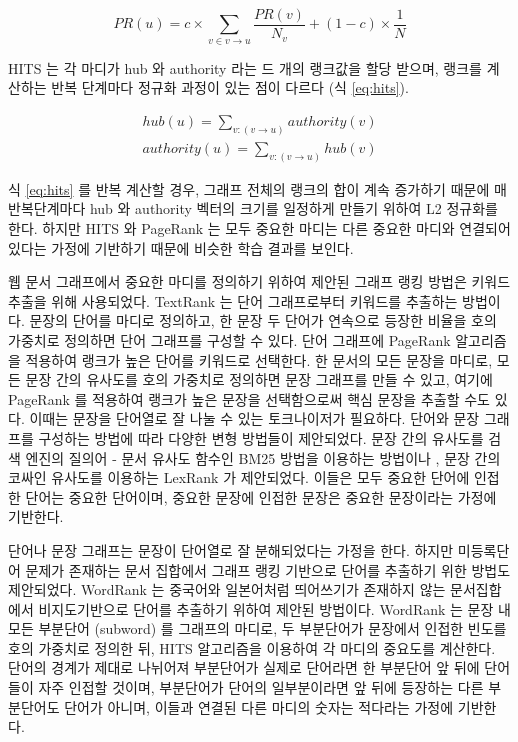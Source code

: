 \documentclass[11pt]{article}
\begin{document}
\begin{equation}
  \label{eq:pagerank2}
  PR(u) = c \times \sum_{v \in v \rightarrow u} \frac{PR(v)}{N_v} + (1-c) \times \frac{1}{N}
\end{equation}

HITS 는 각 마디가 hub 와 authority 라는 드 개의 랭크값을 할당 받으며, 랭크를 계산하는 반복 단계마다 정규화 과정이 있는 점이 다르다 (식 \ref{eq:hits}).

\begin{equation}
  \label{eq:hits}
  \begin{aligned}
  hub(u) = \sum_{v:(v \rightarrow u)} authority(v) \\
  authority(u) = \sum_{v:(v \rightarrow u)} hub(v)
  \end{aligned}
\end{equation}

식 \ref{eq:hits} 를 반복 계산할 경우, 그래프 전체의 랭크의 합이 계속 증가하기 때문에 매 반복단계마다 hub 와 authority 벡터의 크기를 일정하게 만들기 위하여 L2 정규화를 한다.
하지만 HITS 와 PageRank 는 모두 중요한 마디는 다른 중요한 마디와 연결되어 있다는 가정에 기반하기 때문에 비슷한 학습 결과를 보인다.

웹 문서 그래프에서 중요한 마디를 정의하기 위하여 제안된 그래프 랭킹 방법은 키워드 추출을 위해 사용되었다.
TextRank \citep{mihalcea2004textrank} 는 단어 그래프로부터 키워드를 추출하는 방법이다.
문장의 단어를 마디로 정의하고, 한 문장 두 단어가 연속으로 등장한 비율을 호의 가중치로 정의하면 단어 그래프를 구성할 수 있다.
단어 그래프에 PageRank 알고리즘을 적용하여 랭크가 높은 단어를 키워드로 선택한다.
한 문서의 모든 문장을 마디로, 모든 문장 간의 유사도를 호의 가중치로 정의하면 문장 그래프를 만들 수 있고, 여기에 PageRank 를 적용하여 랭크가 높은 문장을 선택함으로써 핵심 문장을 추출할 수도 있다.
이때는 문장을 단어열로 잘 나눌 수 있는 토크나이저가 필요하다.
단어와 문장 그래프를 구성하는 방법에 따라 다양한 변형 방법들이 제안되었다.
문장 간의 유사도를 검색 엔진의 질의어 - 문서 유사도 함수인 BM25 \citep{robertson2009probabilistic} 방법을 이용하는 방법이나 \citep{barrios2016variations}, 문장 간의 코싸인 유사도를 이용하는 LexRank \citep{erkan2004lexrank} 가 제안되었다.
이들은 모두 중요한 단어에 인접한 단어는 중요한 단어이며, 중요한 문장에 인접한 문장은 중요한 문장이라는 가정에 기반한다.

단어나 문장 그래프는 문장이 단어열로 잘 분해되었다는 가정을 한다.
하지만 미등록단어 문제가 존재하는 문서 집합에서 그래프 랭킹 기반으로 단어를 추출하기 위한 방법도 제안되었다.
WordRank \citep{chen2011simple} 는 중국어와 일본어처럼 띄어쓰기가 존재하지 않는 문서집합에서 비지도기반으로 단어를 추출하기 위하여 제안된 방법이다.
WordRank 는 문장 내 모든 부분단어 (subword) 를 그래프의 마디로, 두 부분단어가 문장에서 인접한 빈도를 호의 가중치로 정의한 뒤, HITS 알고리즘을 이용하여 각 마디의 중요도를 계산한다.
단어의 경계가 제대로 나뉘어져 부분단어가 실제로 단어라면 한 부분단어 앞 뒤에 단어들이 자주 인접할 것이며, 부분단어가 단어의 일부분이라면 앞 뒤에 등장하는 다른 부분단어도 단어가 아니며, 이들과 연결된 다른 마디의 숫자는 적다라는 가정에 기반한다.
\end{document}
